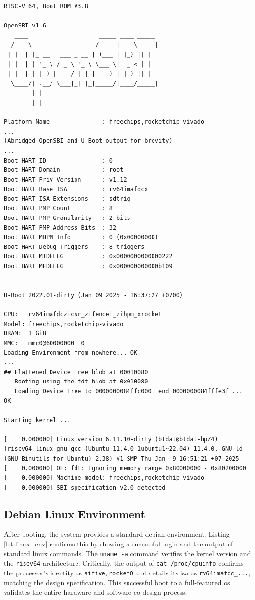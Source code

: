 \begin{lstlisting}[style=terminalstyle, caption={Console output capturing the full boot sequence from Boot ROM to the Linux kernel.}, label={lst:boot_log}]
RISC-V 64, Boot ROM V3.8

OpenSBI v1.6
   ____                    _____ ____ _____
  / __ \                  / ____|  _ \_   _|
 | |  | |_ __   ___ _ __ | (___ | |_) || |
 | |  | | '_ \ / _ \ '_ \ \___ \|  _ < | |
 | |__| | |_) |  __/ | | |____) | |_) || |_
  \____/| .__/ \___|_| |_|_____/|____/_____|
        | |
        |_|

Platform Name               : freechips,rocketchip-vivado
...
(Abridged OpenSBI and U-Boot output for brevity)
...
Boot HART ID                : 0
Boot HART Domain            : root
Boot HART Priv Version      : v1.12
Boot HART Base ISA          : rv64imafdcx
Boot HART ISA Extensions    : sdtrig
Boot HART PMP Count         : 8
Boot HART PMP Granularity   : 2 bits
Boot HART PMP Address Bits  : 32
Boot HART MHPM Info         : 0 (0x00000000)
Boot HART Debug Triggers    : 8 triggers
Boot HART MIDELEG           : 0x0000000000000222
Boot HART MEDELEG           : 0x000000000000b109


U-Boot 2022.01-dirty (Jan 09 2025 - 16:37:27 +0700)

CPU:   rv64imafdczicsr_zifencei_zihpm_xrocket
Model: freechips,rocketchip-vivado
DRAM:  1 GiB
MMC:   mmc0@60000000: 0
Loading Environment from nowhere... OK
...
## Flattened Device Tree blob at 00010080
   Booting using the fdt blob at 0x010080
   Loading Device Tree to 0000000084ffc000, end 0000000084fffe3f ... OK

Starting kernel ...

[    0.000000] Linux version 6.11.10-dirty (btdat@btdat-hpZ4) (riscv64-linux-gnu-gcc (Ubuntu 11.4.0-1ubuntu1~22.04) 11.4.0, GNU ld (GNU Binutils for Ubuntu) 2.38) #1 SMP Thu Jan  9 16:51:21 +07 2025
[    0.000000] OF: fdt: Ignoring memory range 0x80000000 - 0x80200000
[    0.000000] Machine model: freechips,rocketchip-vivado
[    0.000000] SBI specification v2.0 detected
\end{lstlisting}

\subsection{Debian Linux Environment}
After booting, the system provides a standard \acrlong{debian} environment. Listing \ref{lst:linux_env} confirms this by showing a successful login and the output of standard \acrshort{linux} commands. The \texttt{uname -a} command verifies the kernel version and the \texttt{riscv64} architecture. Critically, the output of \texttt{cat /proc/cpuinfo} confirms the processor's identity as \texttt{sifive,rocket0} and details its \acrshort{isa} as \texttt{rv64imafdc\_...}, matching the design specification. This successful boot to a full-featured \acrshort{os} validates the entire hardware and software co-design process.


